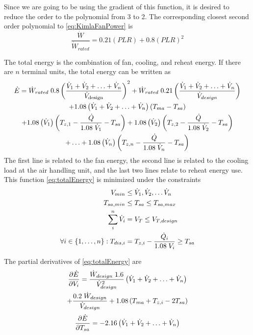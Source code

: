 Since we are going to be using the gradient of this function, it is desired to reduce the order to the polynomial from 3 to 2. The corresponding closest second order polynomial to \ref{eq:KimlaFanPower} is
\begin{equation}\label{eq:finalFanPower}
\frac{\dot{W}}{\dot{W}_{rated}} = 0.21\left(PLR \right)+0.8\left(PLR \right)^2
\end{equation}

The total energy is the combination of fan, cooling, and reheat energy. If there are \(n\) terminal units, the total energy can be written as
\begin{multline}\label{eq:totalEnergy}
    \dot{E}=\dot{W}_{rated}\;0.8 \left(\frac{\dot{V}_{1}+\dot{V}_{2}+\ldots+\dot{V}_{n}}{\dot{V}_{\text{design}}} \right)^2 + \dot{W}_{rated}\;0.21 \left(\frac{\dot{V}_{1}+\dot{V}_{2}+\ldots+\dot{V}_{n}}{\dot{V}_{design}} \right)\\
+1.08\left(\dot{V}_{1}+\dot{V}_{2}+\ldots+\dot{V}_{n} \right)\left(T_{ma}-T_{sa} \right)\\
+1.08\left(\dot{V}_{1} \right)\left(T_{z,1}-\frac{\dot{Q}}{1.08\; \dot{V}_{1}} -T_{sa}\right) +1.08\left(\dot{V}_{2} \right)\left(T_{z,2}-\frac{\dot{Q}}{1.08\; \dot{V}_{2}} -T_{sa}\right)\\ 
+\ldots+1.08\left(\dot{V}_{n} \right)\left(T_{z,n}-\frac{\dot{Q}}{1.08\; \dot{V}_{n}} -T_{sa}\right) 
\end{multline}
The first line is related to the fan energy, the second line is related to the cooling load at the air handling unit, and the last two lines relate to reheat energy use. 
This function \ref{eq:totalEnergy} is minimized under the constraints
\begin{align}
    V_{min}&\leq \dot{V}_{1}, \dot{V}_{2}, \ldots \dot{V}_{n} \\
T_{sa,min}&\leq T_{sa} \leq T_{sa,max} \\
    \sum_i^n \dot{V}_{i} &= V_T \leq V_{T,design} \\
\forall i\in\left\{1,\ldots,n\right\}: T_{dis,i} &= T_{z,i} - \frac{\dot{Q}_i}{1.08\;V_i} \geq T_{sa}
\end{align}

The partial derivatives of \ref{eq:totalEnergy} are 
\begin{multline}
\pdv{\dot{E}}{V_i}=\frac{\dot{W}_{design}\;1.6}{\dot{V}_{design}^2} \left(\dot{V}_{1}+\dot{V}_{2}+\ldots+\dot{V}_{n} \right)\\ 
+\frac{0.2\;\dot{W}_{design}}{\dot{V}_{design}}+ 1.08\left(T_{ma}+T_{z,i} -2T_{sa}\right)
\end{multline}
\begin{equation}
\pdv{\dot{E}}{T_{sa}}=-2.16\left(\dot{V}_{1}+\dot{V}_{2}+\ldots+\dot{V}_{n} \right)
\end{equation}



